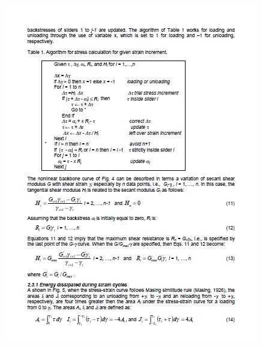 \documentclass[12pt,a4paper]{report}
\begin{document}
\begin{figure}[h!]
	\centering
	\includegraphics[width=1\linewidth]{"NERA 3"}
	\label{Nera3}
\end{figure}
\end{document}
